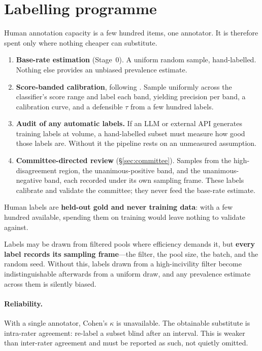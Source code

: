 \documentclass[11pt,a4paper]{article}
\begin{document}
\section{Labelling programme}
\label{sec:validation}

Human annotation capacity is a few hundred items, one annotator. It is therefore
spent only where nothing cheaper can substitute.

\begin{enumerate}
\item \textbf{Base-rate estimation} (Stage~0). A uniform random sample, hand-labelled.
      Nothing else provides an unbiased prevalence estimate.
\item \textbf{Score-banded calibration}, following \cite{garland2020countering}.
      Sample uniformly across the classifier's score range and label each band,
      yielding precision per band, a calibration curve, and a defensible $\tau$ from
      a few hundred labels.
\item \textbf{Audit of any automatic labels.} If an LLM or external API generates
      training labels at volume, a hand-labelled subset must measure how good those
      labels are. Without it the pipeline rests on an unmeasured assumption.
\item \textbf{Committee-directed review} (\S\ref{sec:committee}). Samples from the
      high-disagreement region, the unanimous-positive band, and the
      unanimous-negative band, each recorded under its own sampling frame. These
      labels calibrate and validate the committee; they never feed the base-rate
      estimate.
\end{enumerate}

Human labels are \textbf{held-out gold and never training data}: with a few hundred
available, spending them on training would leave nothing to validate against.

Labels may be drawn from filtered pools where efficiency demands it, but
\textbf{every label records its sampling frame}---the filter, the pool size, the
batch, and the random seed. Without this, labels drawn from a high-incivility filter
become indistinguishable afterwards from a uniform draw, and any prevalence estimate
across them is silently biased.

\paragraph{Reliability.} With a single annotator, Cohen's $\kappa$ is unavailable.
The obtainable substitute is intra-rater agreement: re-label a subset blind after an
interval. This is weaker than inter-rater agreement and must be reported as such,
not quietly omitted.
\end{document}
